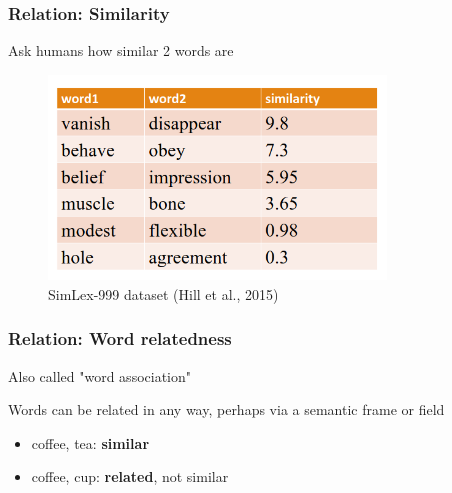 \documentclass[13.5pt,aspecratio=169, xcolor=dvipsnames]{beamer}
\begin{document}
        \begin{frame}
            \onehalfspacing
                \frametitle{Relation: \textbf{Similarity}}
                {\Large
                Ask humans how similar 2 words are}
                \bigskip
                
                \begin{figure}[h]
                    \centering

                    \includegraphics[width=0.8\textwidth]{words_similarity.png}
                    \captionsetup{labelformat=empty}
                    \caption{SimLex-999 dataset (Hill et al., 2015)}
                \end{figure}
            \end{frame}

            \begin{frame}
                \onehalfspacing
                    \frametitle{Relation: Word relatedness}
                    {\Large
                    \begin{minipage}{0.53\textwidth}
                        \begin{block}{}
                            Also called "word association"
                        \end{block}

                        \bigskip

                    \end{minipage}

                    Words can be related in any way, perhaps via a semantic frame or field

                    \begin{itemize}
                        \item coffee, tea: \textbf{similar}
                        \item coffee, cup: \textbf{related}, not similar
                    \end{itemize}
                    }
                   
                \end{frame}
\end{document}

